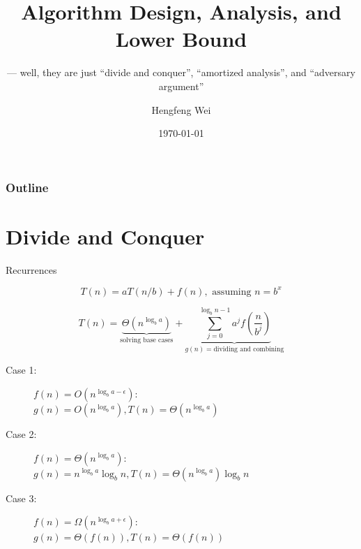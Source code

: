 \documentclass{beamer}
\title{Algorithm Design, Analysis, and Lower Bound}
\subtitle{--- well, they are just ``divide and conquer'', ``amortized
analysis'', and ``adversary argument'' }
\author{Hengfeng Wei}
\institute{hengxin0912@gmail.com}
\date{\today}
\begin{document}
\begin{frame}
	\titlepage
\end{frame}

\begin{frame}
	\frametitle{Outline}
	\tableofcontents
\end{frame}

\section{Divide and Conquer}

\begin{frame}{Recurrences}

  \[
    T(n) = aT(n/b) + f(n), \textrm{ assuming } n = b^{x}
  \]

  \[
    T(n) = \underbrace{\Theta(n^{\log_{b}{a}})}_{\textrm{solving base cases}} +
    \underbrace{\sum_{j = 0}^{\log_{b}{n} - 1} a^{j}
    f(\frac{n}{b^{j}})}_{g(n) = \textrm{dividing and combining}}
  \]

  \begin{description}
    \item[Case 1:] $f(n) = O(n^{\log_{b}{a} - \epsilon}):$ \\
    \hspace{1.0cm} $g(n) = O(n^{\log_{b}{a}}), T(n) = \Theta(n^{\log_{b}{a}})$
    \item[Case 2:] $f(n) = \Theta(n^{\log_{b}{a}}):$  \\
    \hspace{1.0cm} $g(n) = n^{\log_{b}{a}}\log_{b}{n}, T(n) =
    \Theta(n^{\log_{b}{a}})\log_{b}{n}$
    \item[Case 3:] $f(n) = \Omega(n^{\log_{b}{a} + \epsilon}):$ \\
    \hspace{1.0cm} $g(n) = \Theta(f(n)), T(n) = \Theta(f(n))$
  \end{description}
\end{frame}
\end{document}
